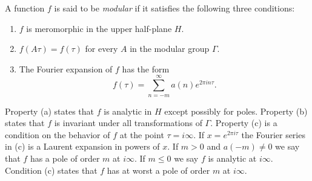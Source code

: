 A function $f$ is said to be \emph{modular} if it satisfies the following three conditions:

\begin{enumerate}
\item[(a)] $f$ is meromorphic in the upper half-plane $H$.
\item[(b)] $f(A\tau) = f(\tau)$ for every $A$ in the modular group $\Gamma$.
\item[(c)] The Fourier expansion of $f$ has the form
$$f(\tau) = \sum_{n=-m}^{\infty} a(n)e^{2\pi i n \tau}.$$
\end{enumerate}

Property (a) states that $f$ is analytic in $H$ except possibly for poles. Property (b) states that $f$ is invariant under all transformations of $\Gamma$. Property (c) is a condition on the behavior of $f$ at the point $\tau = i\infty$. If $x = e^{2\pi i \tau}$ the Fourier series in (c) is a Laurent expansion in powers of $x$. If $m > 0$ and $a(-m) \neq 0$ we say that $f$ has a pole of order $m$ at $i\infty$. If $m \leq 0$ we say $f$ is analytic at $i\infty$. Condition (c) states that $f$ has at worst a pole of order $m$ at $i\infty$.
